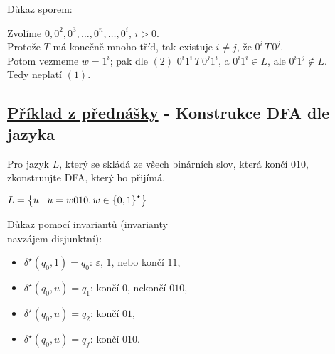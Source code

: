 Důkaz sporem: 

Zvolíme $0, 0^2, 0^3, \dots, 0^n, \dots, 0^i$, $i > 0$. \\ 
Protože $T$ má konečně mnoho tříd, tak existuje $i \neq j$, že $0^i \, T \, 0^j$. \\
Potom vezmeme $w = 1^i$; pak dle $(2)$ $0^i 1^i \, T \, 0^j 1^i$, a $0^i 1^i \in L$, ale $0^i 1^j \notin L$. \\
Tedy neplatí $(1)$. 

\subsection{\href{https://youtu.be/agNAMdc8zYY?list=PLQL6z4JeTTQkLuzI78OTnfYBclE1g0UjS&t=4106}{Příklad z přednášky} - Konstrukce DFA dle jazyka} 
Pro jazyk $L$, který se skládá ze všech binárních slov, která končí $010$, zkonstruujte DFA, který ho přijímá.\\

\begin{minipage}{0.58\textwidth}
    $L = \left\lbrace u \mid u = w010, w \in \left\lbrace 0,1 \right\rbrace^{\star} \right\rbrace$\\

    
\end{minipage}\begin{minipage}{0.42\textwidth}
    Důkaz pomocí invariantů (invarianty \\navzájem disjunktní):

    \begin{itemize}[noitemsep]
        \item $\delta^\star (q_0, 1) = q_0$: $\varepsilon$, $1$, nebo končí $11$, 
        \item $\delta^\star (q_0, u) = q_1$: končí $0$, nekončí $010$, 
        \item $\delta^\star (q_0, u) = q_2$: končí $01$, 
        \item $\delta^\star (q_0, u) = q_f$: končí $010$. 
    \end{itemize}    

\end{minipage}
    
